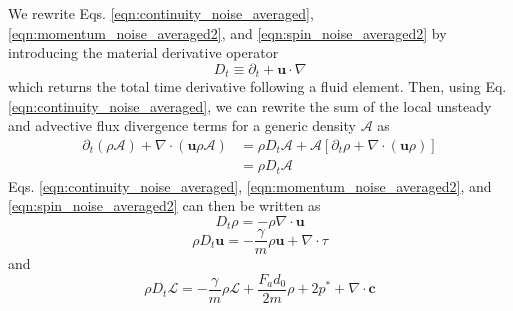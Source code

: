 \documentclass[%
 reprint,
superscriptaddress,
longbibliography,
 amsmath,amssymb,
 prl,
 citeautoscript,
]{revtex4-1}
\begin{document}
We rewrite Eqs. \ref{eqn:continuity_noise_averaged}, \ref{eqn:momentum_noise_averaged2}, and \ref{eqn:spin_noise_averaged2} by introducing the material derivative operator
\begin{equation}
D_t \equiv \partial_t + {\boldsymbol u} \cdot \nabla
\label{eqn:material_derivative}
\end{equation}
which returns the total time derivative following a fluid element. Then, using Eq. \ref{eqn:continuity_noise_averaged}, we can rewrite the sum of the local unsteady and advective flux divergence terms for a generic density $\mathcal{A}$ as
\begin{equation}
\begin{split}
\partial_t \left( \rho \mathcal{A} \right) + \nabla \cdot \left( {\boldsymbol u} \rho \mathcal{A} \right) &= \rho D_t \mathcal{A} + \mathcal{A} \left[ \partial_t \rho + \nabla \cdot \left( {\boldsymbol u} \rho \right) \right] \\
&= \rho D_t \mathcal{A}
\end{split}
\label{eqn:time_derivative_conversion}
\end{equation}
Eqs. \ref{eqn:continuity_noise_averaged}, \ref{eqn:momentum_noise_averaged2}, and \ref{eqn:spin_noise_averaged2} can then be written as
\begin{equation}
D_t \rho = - \rho \nabla \cdot {\boldsymbol u}
\label{eqn:avg_continuity_generic}
\end{equation}
\begin{equation}
\rho D_t {\boldsymbol u} = - \frac{\gamma}{m} \rho {\boldsymbol u} + \nabla \cdot \tau
\label{eqn:avg_linear_momentum_generic}
\end{equation}
and
\begin{equation}
\rho D_t \mathcal{L} = - \frac{\gamma}{m} \rho \mathcal{L} + \frac{F_a d_0}{2 m} \rho + 2 p^* + \nabla \cdot {\boldsymbol c}
\label{eqn:avg_spin_generic}
\end{equation}
\end{document}
